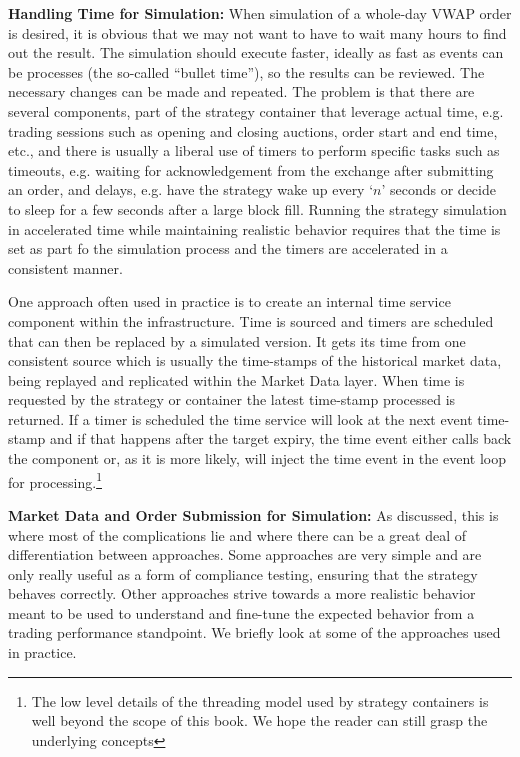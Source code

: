 \noindent\textbf{Handling Time for Simulation:} When simulation of a whole-day VWAP order is desired, it is obvious that we may not want to have to wait many hours to find out the result. The simulation should execute faster, ideally as fast as events can be processes (the so-called ``bullet time''), so the results can be reviewed. The necessary changes can be made and repeated. The problem is that there are several components, part of the strategy container that leverage actual time, e.g. trading sessions such as opening and closing auctions, order start and end time, etc., and there is usually a liberal use of timers to perform specific tasks such as timeouts, e.g. waiting for acknowledgement from the exchange after submitting an order, and delays, e.g. have the strategy wake up every `$n$' seconds or decide to sleep for a few seconds after a large block fill. Running the strategy simulation in accelerated time while maintaining realistic behavior requires that the time is set as part fo the simulation process and the timers are accelerated in a consistent manner.


One approach often used in practice is to create an internal time service component within the infrastructure. Time is sourced and timers are scheduled that can then be replaced by a simulated version. It gets its time from one consistent source which is usually the time-stamps of the historical market data, being replayed and replicated within the Market Data layer. When time is requested by the strategy or container the latest time-stamp processed is returned. If a timer is scheduled the time service will look at the next event time-stamp and if that happens after the target expiry, the time event either calls back the component or, as it is more likely, will inject the time event in the event loop for processing.\footnote{The low level details of the threading model used by strategy containers is well beyond the scope of this book. We hope the reader can still grasp the underlying concepts} \twomedskip


\noindent\textbf{Market Data and Order Submission for Simulation:} As discussed, this is where most of the complications lie and where there can be a great deal of differentiation between approaches. Some approaches are very simple and are only really useful as a form of compliance testing, ensuring that the strategy behaves correctly. Other approaches strive towards a more realistic behavior meant to be used to understand and fine-tune the expected behavior from a trading performance standpoint. We briefly look at some of the approaches used in practice. \twomedskip


